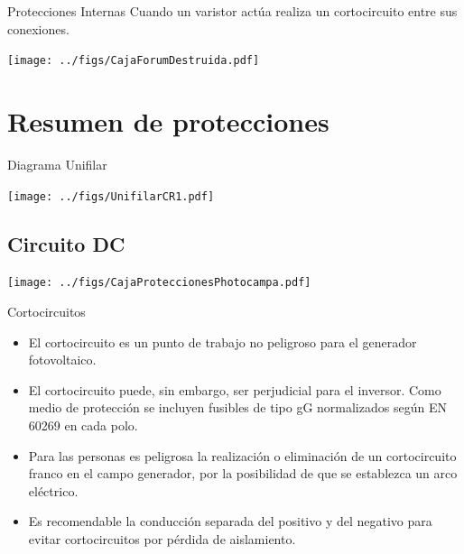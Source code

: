 \documentclass[aspectratio=169, usenames,svgnames,dvipsnames]{beamer}
\begin{document}
\begin{frame}[label={sec:orgdc45874}]{Protecciones Internas}
Cuando un varistor actúa realiza un cortocircuito entre sus conexiones.
\begin{center}
\texttt{[image: ../figs/CajaForumDestruida.pdf]}
\end{center}
\end{frame}

\section{Resumen de protecciones}
\label{sec:org6204e35}

\begin{frame}[label={sec:orgf5131c0},plain]{Diagrama Unifilar}
\begin{center}
\texttt{[image: ../figs/UnifilarCR1.pdf]}
\end{center}
\end{frame}

\subsection{Circuito DC}
\label{sec:org935e4f9}
\begin{frame}[label={sec:org15b672a}]{}
\begin{center}
\texttt{[image: ../figs/CajaProteccionesPhotocampa.pdf]}
\end{center}
\end{frame}


\begin{frame}[label={sec:orgf5bf687}]{Cortocircuitos}
\begin{itemize}
\item El \alert{cortocircuito} es un punto de trabajo \alert{no peligroso para el
generador fotovoltaico}.

\item El cortocircuito puede, sin embargo, ser \alert{perjudicial para el
inversor}. Como medio de protección se incluyen fusibles de tipo gG
normalizados según EN 60269 en cada polo.

\item Para las personas es \alert{peligrosa la realización o eliminación de un
cortocircuito franco en el campo generador}, por la posibilidad de
que se establezca un arco eléctrico.

\item Es recomendable la \alert{conducción separada} del positivo y del negativo
para evitar cortocircuitos por pérdida de aislamiento.
\end{itemize}
\end{frame}
\end{document}
